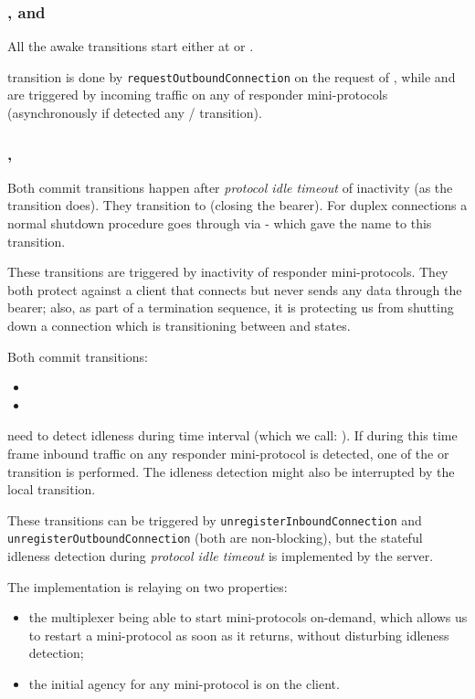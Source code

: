 \subsubsection{\AwakeDupLoc{}, \AwakeDupRem{} and \AwakeUniRem{}}
All the awake transitions start either at \InboundIdleStateUni{} or
\InboundIdleStateDup{}.

\begin{detail}
  \AwakeDupLoc{} transition is done by \texttt{requestOutboundConnection} on
  the request of \ptopgov{}, while \AwakeDupRem{} and \AwakeUniRem{} are
  triggered by incoming traffic on any of responder mini-protocols (asynchronously if
  detected any \warm{}/\hot{} transition).
\end{detail}


\subsubsection{\CommitUni{}, \CommitDup{}}\label{sec:tr_commit}
Both commit transitions happen after \textit{protocol idle timeout} of
inactivity (as the \TimeoutExpired{} transition does). They transition to
\TerminatingState{} (closing the bearer). For duplex connections a normal
shutdown procedure goes through \InboundIdleStateDup{}
via \CommitDup{} - which gave the name to this transition.

These transitions are triggered by inactivity of responder mini-protocols. They
both protect against a client that connects but never sends any data through
the bearer; also, as part of a termination sequence, it is protecting us from
shutting down a connection which is transitioning between \warm{} and \hot{}
states.

Both commit transitions:
\begin{itemize}
  \item \CommitDup{}
  \item \CommitUni{}
\end{itemize}

need to detect idleness during time interval (which we call: ). If during this time frame inbound traffic on any responder
mini-protocol is detected, one of the \AwakeDupRem{} or \AwakeUniRem{}
transition is performed. The idleness detection might also be interrupted by
the local \AwakeDupLoc{} transition.

\begin{detail}
  These transitions can be triggered by \texttt{unregisterInboundConnection} and
  \texttt{unregisterOutboundConnection} (both are non-blocking), but the
  stateful idleness detection during \textit{protocol idle timeout} is
  implemented by the server.

  The implementation is relaying on two properties:
  \begin{itemize}
    \item the multiplexer being able to start mini-protocols on-demand, which
      allows us to restart a mini-protocol as soon as it returns, without
      disturbing idleness detection;
    \item the initial agency for any mini-protocol is on the client.
  \end{itemize}
\end{detail}

